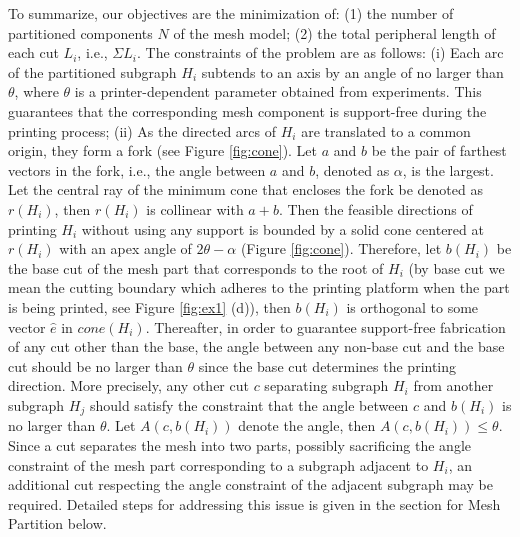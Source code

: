 To summarize, our objectives are the minimization of: (1) the number of partitioned components $N$ of the mesh model; (2) the total peripheral length of each cut $L_i$, i.e., $\Sigma L_i$. The constraints of the problem are as follows:
(i) Each arc of the partitioned subgraph $H_i$ subtends to an axis by an angle of no larger than $\theta$, where $\theta$ is a printer-dependent parameter obtained from experiments. This guarantees that the corresponding mesh component is support-free during the printing process;
(ii) As the directed arcs of $H_i$ are translated to a common origin, they form a fork (see Figure \ref{fig:cone}). Let $a$ and $b$ be the pair of farthest vectors in the fork, i.e., the angle between $a$ and $b$, denoted as $\alpha$, is the largest. Let the central ray of the minimum cone that encloses the fork be denoted as $r(H_i)$, then $r(H_i)$ is collinear with $a + b$. Then the feasible directions of printing $H_i$ without using any support is bounded by a solid cone centered at $r(H_i)$ with an apex angle of $2\theta - \alpha$ (Figure \ref{fig:cone}). Therefore, let $b(H_i)$ be the base cut of the mesh part that corresponds to the root of $H_i$ {(by base cut we mean the cutting boundary which adheres to the printing platform when the part is being printed, see Figure \ref{fig:ex1} (d))}, then $b(H_i)$ is orthogonal to some vector $\hat{e}$ in $cone(H_i)$. %
Thereafter, in order to guarantee support-free fabrication of any cut other than the base, the angle between any non-base cut and the base cut should be no larger than $\theta$ since the base cut determines the printing direction. More precisely, any other cut $c$ separating subgraph $H_i$ from another subgraph $H_j$ should satisfy the constraint that the angle between $c$ and $b(H_i)$ is no larger than $\theta$. Let $A(c, b(H_i))$ denote the angle, then $A(c, b(H_i)) \leq \theta$. Since a cut separates the mesh into two parts, possibly sacrificing the angle constraint of the mesh part corresponding to a subgraph adjacent to $H_i$, an additional cut respecting the angle constraint of the adjacent subgraph may be required. Detailed steps for addressing this issue is given in the section for Mesh Partition below.

